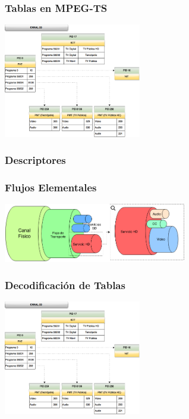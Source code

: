 \documentclass[a4paper,11pt]{beamer}
\begin{document}
			\begin{frame}
				\frametitle{Tablas en MPEG-TS}
					\begin{center}
						\includegraphics[width=6cm]{canal_23_tables.png}
					\end{center}
			\end{frame}

			\begin{frame}
				\frametitle{Descriptores}
				\resizebox{\textwidth}{!}{
					
				}
			\end{frame}

			\begin{frame}
				\frametitle{Flujos Elementales}
				\begin{center}
					\includegraphics[width=8cm]{cable_flujo_mpeg.png}
				\end{center}
			\end{frame}
			
			\begin{frame}
				\frametitle{Decodificación de Tablas}
					\begin{center}
						\includegraphics[width=6cm]{canal_23_tables.png}
					\end{center}
			\end{frame}
\end{document}
